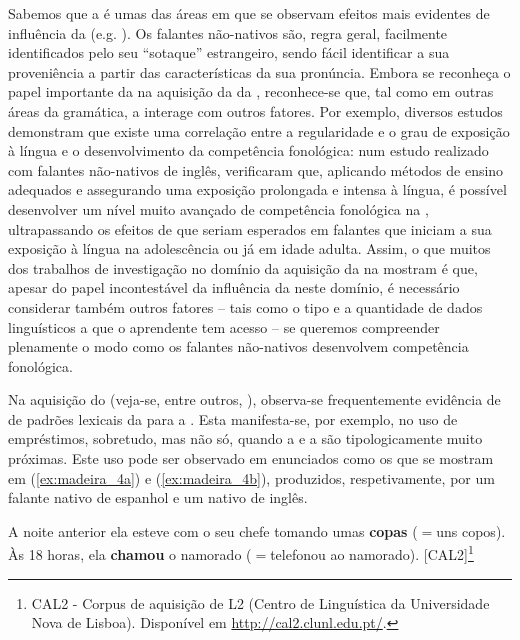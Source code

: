 \documentclass[output=paper]{LSP/langsci}
\begin{document}
Sabemos que a  é umas das áreas em que se observam efeitos mais evidentes de influência da  (e.g. \citealt{broselow1988}). Os falantes não-nativos são, regra geral, facilmente identificados pelo seu ``sotaque'' estrangeiro, sendo fácil identificar a sua proveniência a partir das características da sua pronúncia. Embora se reconheça o papel importante da  na aquisição da  da , reconhece-se que, tal como em outras áreas da gramática, a  interage com outros fatores. Por exemplo, diversos estudos demonstram que existe uma correlação entre a regularidade e o grau de exposição à língua e o desenvolvimento da competência fonológica: num estudo realizado com falantes não-nativos de inglês, \citet{bongaerts_etal1995} verificaram que, aplicando métodos de ensino adequados e assegurando uma exposição prolongada e intensa à língua, é possível desenvolver um nível muito avançado de competência fonológica na , ultrapassando os efeitos de  que seriam esperados em falantes que iniciam a sua exposição à língua na adolescência ou já em idade adulta. Assim, o que muitos dos trabalhos de investigação no domínio da aquisição da  na  mostram é que, apesar do papel incontestável da influência da  neste domínio, é necessário considerar também outros fatores – tais como o tipo e a quantidade de dados linguísticos a que o aprendente tem acesso – se queremos compreender plenamente o modo como os falantes não-nativos desenvolvem competência fonológica.

Na aquisição do  (veja-se, entre outros, \citealt{leiria2001}), observa-se frequentemente evidência de  de padrões lexicais da  para a . Esta  manifesta-se, por exemplo, no uso de empréstimos, sobretudo, mas não só, quando a  e a  são tipologicamente muito próximas. Este uso pode ser observado em enunciados como os que se mostram em (\ref{ex:madeira_4a}) e (\ref{ex:madeira_4b}), produzidos, respetivamente, por um falante nativo de espanhol e um nativo de inglês. 

\ea\label{ex:madeira_4}
\ea\label{ex:madeira_4a} A noite anterior ela esteve com o seu chefe tomando umas \textbf{copas} ($=$uns copos).
\ex\label{ex:madeira_4b} Às 18 horas, ela \textbf{chamou} o namorado ($=$telefonou ao namorado).  [CAL2]\footnote{CAL2 - Corpus de aquisição de L2 (Centro de Linguística da Universidade Nova de Lisboa). Disponível em \url{http://cal2.clunl.edu.pt/}.}
\zl
\end{document}
